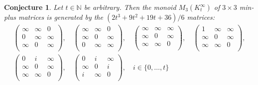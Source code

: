 \documentclass{amsart}
\newcommand{\N}{\mathbb{N}}
\numberwithin{equation}{section}
\newtheorem{conj}[equation]{Conjecture}
\theoremstyle{definition}
\begin{document}
\begin{conj}
  Let $t\in \N$ be arbitrary. Then the monoid $M_3(K^{\infty}_t)$ of $3 \times
  3$ min-plus matrices is generated by the $(2t^3 + 9t^2 + 19t + 36)/6$
  matrices:
  \begin{equation*}
    \begin{array}{l}
      \begin{pmatrix}
        \infty & \infty & 0      \\
        0      & \infty & \infty \\
        \infty & 0      & \infty \\
      \end{pmatrix},
      \quad
      \begin{pmatrix}
        \infty & \infty & 0      \\
        \infty & 0      & \infty \\
        0      & \infty & \infty \\
      \end{pmatrix},
      \quad
      \begin{pmatrix}
        \infty & \infty & \infty \\
        \infty & 0      & \infty \\
        \infty & \infty & 0      \\
      \end{pmatrix},
      \quad
      \begin{pmatrix}
        1      & \infty & \infty \\
        \infty & 0      & \infty \\
        \infty & \infty & 0      \\
      \end{pmatrix},
      \\
      \begin{pmatrix}
        0      & i      & \infty \\
        \infty & 0      & \infty \\
        \infty & \infty & 0      \\
      \end{pmatrix},
      \quad
      \begin{pmatrix}
        0      & i      & \infty \\
        \infty & 0      & i      \\
        i      & \infty & 0      \\
      \end{pmatrix}, 
      \quad
      i \in \{0, \ldots, t\}
      \\

\end{array}
\end{equation*}
\end{conj}
\end{document}
